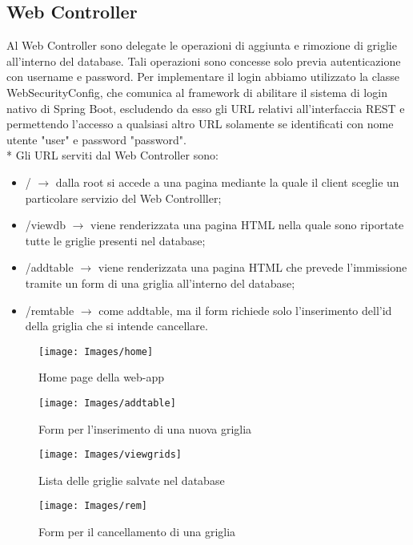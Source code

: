 \subsection{Web Controller}
Al Web Controller sono delegate le operazioni di aggiunta e rimozione di griglie all'interno del database. Tali operazioni sono concesse solo previa autenticazione con username e password. Per implementare il login abbiamo utilizzato la classe WebSecurityConfig, che comunica al framework di abilitare il sistema di login nativo di Spring Boot, escludendo da esso gli URL relativi all'interfaccia REST e permettendo l'accesso a qualsiasi altro URL solamente se identificati con nome utente "user" e password "password".\\*
Gli URL serviti dal Web Controller sono:
\begin{itemize}
	\item / $\rightarrow$ dalla root si accede a una pagina mediante la quale il client sceglie un particolare servizio del Web Controlller;

	
	\item /viewdb $\rightarrow$ viene renderizzata una pagina HTML nella quale sono riportate tutte le griglie presenti nel database;

	\item /addtable $\rightarrow$ viene renderizzata una pagina HTML che prevede l'immissione tramite un form di una griglia all'interno del database;
	
	\item /remtable $\rightarrow$ come addtable, ma il form richiede solo l'inserimento dell'id della griglia che si intende cancellare.
\end{itemize}
\newpage
	\begin{figure}[ht]
	\centering
	\texttt{[image: Images/home]}
	\caption{Home page della web-app}
	\label{fig:home}
\end{figure}
	\begin{figure}[ht]
	\centering
	\texttt{[image: Images/addtable]}
	\caption{Form per l'inserimento di una nuova griglia}
	\label{fig:home}
\end{figure}
	\begin{figure}[ht]
	\centering
	\texttt{[image: Images/viewgrids]}
	\caption{Lista delle griglie salvate nel database}
	\label{fig:home}
\end{figure}
	\begin{figure}[ht]
	\centering
	\texttt{[image: Images/rem]}
	\caption{Form per il cancellamento di una griglia}
	\label{fig:home}
\end{figure}
\newpage
